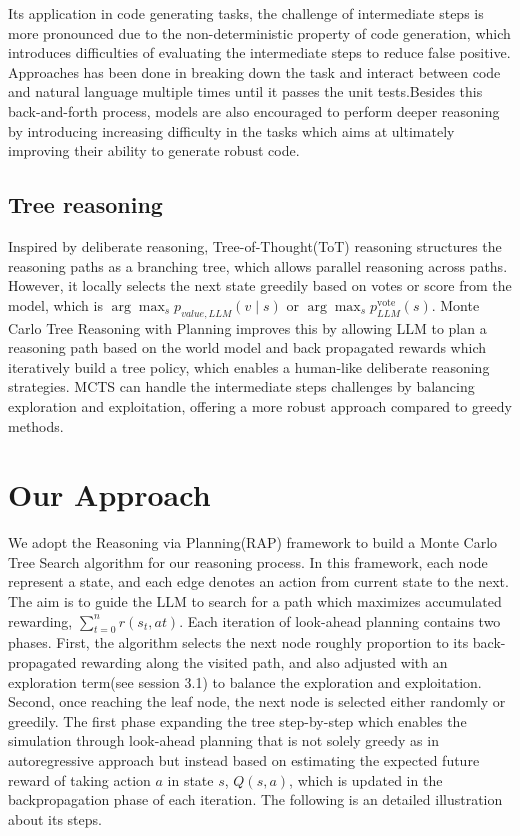 \documentclass[11pt]{article}
\begin{document}
Its application in code generating tasks, the challenge of intermediate steps is more pronounced due to the non-deterministic property of code generation\citep{Ouyang_2024}, which introduces difficulties of evaluating the intermediate steps to reduce false positive. Approaches has been done in breaking down the task and interact between code and natural language multiple times until it passes the unit tests\citep{ding2024semcodertrainingcodelanguage}.Besides this back-and-forth process, models are also encouraged to perform deeper reasoning by introducing increasing difficulty in the tasks which aims at ultimately improving their ability to generate robust code\citep{luo2023wizardcoderempoweringcodelarge}.


\subsection{Tree reasoning}
Inspired by deliberate reasoning, Tree-of-Thought(ToT) reasoning structures the reasoning paths as a branching tree, which allows parallel reasoning across paths\citep{yao2023treethoughtsdeliberateproblem}. However, it locally selects the next state greedily based on votes or score from the model, which is $\arg\max_{s}p_{value,LLM}(v\mid s)$ or $\arg\max_{s} p_{LLM}^{\text{vote}}(s)$. Monte Carlo Tree Reasoning with Planning improves this by allowing LLM to plan a reasoning path based on the world model and back propagated rewards which iteratively build a tree policy, which enables a human-like deliberate reasoning strategies\citep{hao2023reasoninglanguagemodelplanning}. MCTS can handle the intermediate steps challenges by balancing exploration and exploitation, offering a more robust approach compared to greedy methods.

\section{Our Approach}
We adopt the Reasoning via Planning(RAP) framework to build a Monte Carlo Tree Search algorithm for our reasoning process\citep{hao2023reasoninglanguagemodelplanning}. In this framework, each node represent a state, and each edge denotes an action from current state to the next. The aim is to guide the LLM to search for a path which maximizes accumulated rewarding, $\sum_{t=0}^{n} r(s_{t},a{t})$. Each iteration of look-ahead planning contains two phases. First, the algorithm selects the next node roughly proportion to its back-propagated rewarding along the visited path, and also adjusted with an exploration term(see session 3.1) to balance the exploration and exploitation. Second, once reaching the leaf node, the next node is selected either randomly or greedily. The first phase expanding the tree step-by-step which enables the simulation through look-ahead planning that is not solely greedy as in autoregressive approach but instead based on estimating the expected future reward of taking action \(a\) in state \(s\),  \(Q(s,a)\), which is updated in the backpropagation phase of each iteration. The following is an detailed illustration about its steps. 
\end{document}
